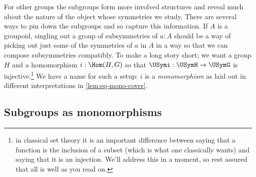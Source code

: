 For other groups the subgroups form more involved structures and reveal much about the nature of the object whose symmetries we study.
There are several ways to pin down the subgroups and so capture this information.
If $A$ is a groupoid, singling out a group of subsymmetries of $a:A$ should be a way of picking out just some of the symmetries of $a$ in $A$ in a way so that we can compose subsymmetries compatibly.  To make a long story short; we want a group $H$ and a homomorphism $i:\Hom(H,G)$ so that $\USymi:\USymH\to\USymG$ is injective.\footnote{in classical set theory it is an important difference between saying that a function is the inclusion of a subset (which is what one classically wants) and saying that it is an injection.  We'll address this in a moment, so rest assured that all is well as you read on.}  We have a name for such a setup: $i$ is a \emph{monomorphism} as laid out in different interpretations in \cref{lem:eq-mono-cover}.

\subsection{Subgroups as monomorphisms}

